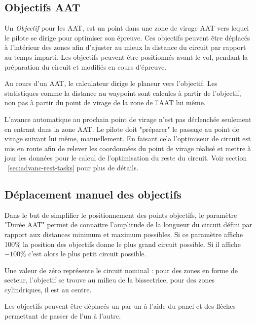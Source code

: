 \subsection*{Objectifs AAT}

Un {\em Objectif} pour les AAT, est un point dans une zone de virage AAT vers lequel le pilote se dirige pour optimiser son épreuve. Ces objectifs peuvent être déplacés à l'intérieur des zones afin d'ajuster au mieux la distance du circuit par rapport au temps imparti. Les objectifs peuvent être positionnés avant le vol, pendant la préparation du circuit et modifiés en cours d'épreuve.

Au cours d'un AAT, le calculateur dirige le planeur vers l'objectif. Les statistiques comme la distance au waypoint sont calcules à partir de l'objectif, non pas à partir du point de virage de la zone de l'AAT lui même.

L'avance automatique au prochain point de virage n'est pas déclenchée seulement en entrant dans la zone AAT. Le pilote doit "préparer" le passage au point de virage suivant lui même, manuellement. En faisant cela l'optimiseur de circuit est mis en route afin de relever les coordonnées du point de virage réalisé et mettre à jour les données pour le calcul de l'optimisation du reste du circuit. Voir section ~\ref{sec:advanc-rest-tasks} pour plus de détails.

\subsection*{Déplacement manuel des objectifs}
Dans le but de simplifier le positionnement des points objectifs, le paramètre "Durée AAT" permet de connaitre l'amplitude de la longueur du circuit défini par rapport aux distances minimum et maximum possibles. Si ce paramètre affiche 100\% la position des objectifs donne le plus grand circuit possible. Si il affiche ~$-100$\% c'est alors le plus petit circuit possible.

Une valeur de zéro représente le circuit nominal : pour des zones en forme de secteur, l'objectif se trouve au milieu de la bissectrice, pour des zones cylindriques, il est au centre.

Les objectifs peuvent être déplacés un par un à l'aide du panel  et des flèches permettant de passer de l'un à l'autre.\\

